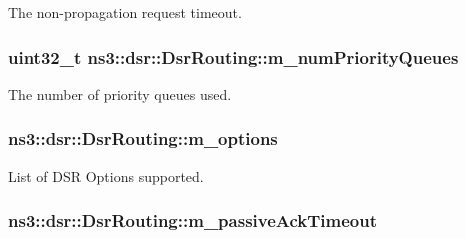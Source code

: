 The non-\/propagation request timeout. 

\subsubsection[{\texorpdfstring{m\+\_\+num\+Priority\+Queues}{m_numPriorityQueues}}]{\setlength{\rightskip}{0pt plus 5cm}uint32\+\_\+t ns3\+::dsr\+::\+Dsr\+Routing\+::m\+\_\+num\+Priority\+Queues\hspace{0.3cm}{\ttfamily [private]}}\hypertarget{classns3_1_1dsr_1_1DsrRouting_aa1952258d04f2ca8a0980d8436bca317}{}\label{classns3_1_1dsr_1_1DsrRouting_aa1952258d04f2ca8a0980d8436bca317}


The number of priority queues used. 

\subsubsection[{\texorpdfstring{m\+\_\+options}{m_options}}]{ ns3\+::dsr\+::\+Dsr\+Routing\+::m\+\_\+options\hspace{0.3cm}{\ttfamily [private]}}\hypertarget{classns3_1_1dsr_1_1DsrRouting_a7f705d6856c04b7bce60317db968bf45}{}\label{classns3_1_1dsr_1_1DsrRouting_a7f705d6856c04b7bce60317db968bf45}


List of D\+SR Options supported. 

\subsubsection[{\texorpdfstring{m\+\_\+passive\+Ack\+Timeout}{m_passiveAckTimeout}}]{ ns3\+::dsr\+::\+Dsr\+Routing\+::m\+\_\+passive\+Ack\+Timeout\hspace{0.3cm}{\ttfamily [private]}}\hypertarget{classns3_1_1dsr_1_1DsrRouting_a6155bddae63f0e1fda8afbeebc25a54c}{}\label{classns3_1_1dsr_1_1DsrRouting_a6155bddae63f0e1fda8afbeebc25a54c}


